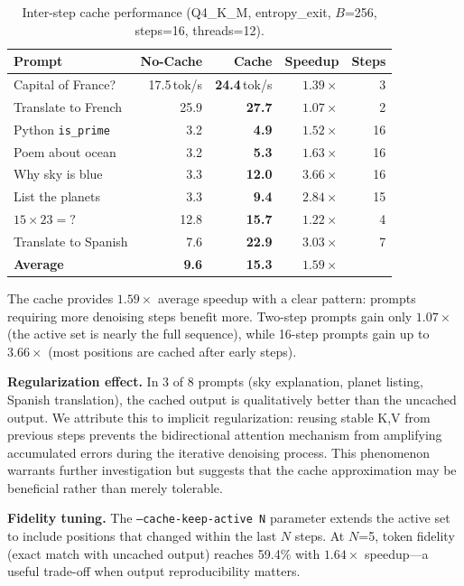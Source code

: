 \documentclass[11pt]{article}
\begin{document}
\begin{table}[h]
\centering
\caption{Inter-step cache performance (Q4\_K\_M, entropy\_exit, $B$=256, steps=16, threads=12).}
\label{tab:cache}
\begin{tabular}{lrrrr}
\toprule
\textbf{Prompt} & \textbf{No-Cache} & \textbf{Cache} & \textbf{Speedup} & \textbf{Steps} \\
\midrule
Capital of France? & 17.5\,tok/s & \textbf{24.4}\,tok/s & $1.39\times$ & 3 \\
Translate to French & 25.9 & \textbf{27.7} & $1.07\times$ & 2 \\
Python \texttt{is\_prime} & 3.2 & \textbf{4.9} & $1.52\times$ & 16 \\
Poem about ocean & 3.2 & \textbf{5.3} & $1.63\times$ & 16 \\
Why sky is blue & 3.3 & \textbf{12.0} & $3.66\times$ & 16 \\
List the planets & 3.3 & \textbf{9.4} & $2.84\times$ & 15 \\
$15 \times 23 = ?$ & 12.8 & \textbf{15.7} & $1.22\times$ & 4 \\
Translate to Spanish & 7.6 & \textbf{22.9} & $3.03\times$ & 7 \\
\midrule
\textbf{Average} & \textbf{9.6} & \textbf{15.3} & $\mathbf{1.59\times}$ & \\
\bottomrule
\end{tabular}
\end{table}

The cache provides $1.59\times$ average speedup with a clear pattern: prompts requiring
more denoising steps benefit more. Two-step prompts gain only $1.07\times$ (the active
set is nearly the full sequence), while 16-step prompts gain up to $3.66\times$ (most
positions are cached after early steps).

\textbf{Regularization effect.} In 3 of 8 prompts (sky explanation, planet listing,
Spanish translation), the cached output is qualitatively better than the uncached
output. We attribute this to implicit regularization: reusing stable K,V from previous
steps prevents the bidirectional attention mechanism from amplifying accumulated errors
during the iterative denoising process. This phenomenon warrants further investigation
but suggests that the cache approximation may be beneficial rather than merely tolerable.

\textbf{Fidelity tuning.} The \texttt{--cache-keep-active N} parameter extends the
active set to include positions that changed within the last $N$ steps. At $N$=5, token
fidelity (exact match with uncached output) reaches 59.4\% with $1.64\times$ speedup---a
useful trade-off when output reproducibility matters.
\end{document}
